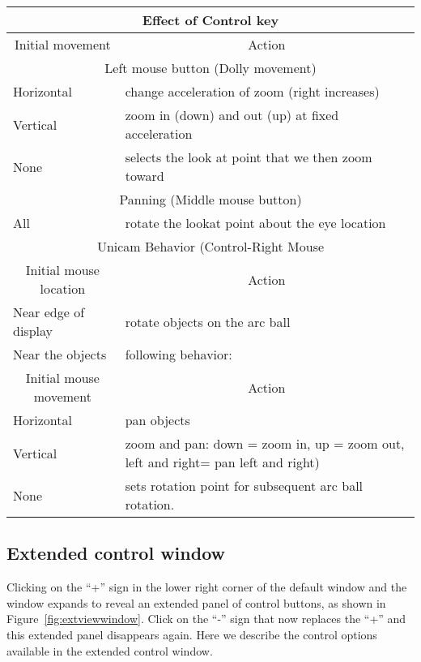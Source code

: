 \begin{center}
\begin{tabular}{|l|p{3in}} \hline
    \multicolumn{2}{|c|}{Effect of Control key} \\ \hline
    \multicolumn{1}{|c|}{Initial movement} & 
    \multicolumn{1}{|c|}{Action}\\ 
    \hline
    \multicolumn{2}{|c|}{Left mouse button (Dolly movement)}\\
    Horizontal & change acceleration of zoom (right increases) \\
    Vertical & zoom in (down) and out (up) at fixed acceleration \\
    None & selects the look at point that we then zoom toward \\
    \hline
    \multicolumn{2}{|c|}{Panning (Middle mouse button)} \\
    All  & rotate the lookat point about the eye location \\
    \hline
    \multicolumn{2}{|c|}{Unicam Behavior (Control-Right Mouse}\\
    \multicolumn{1}{|c|}{Initial mouse location} & 
    \multicolumn{1}{|c|}{Action}\\ 
    \hline
    Near edge of display & rotate objects on the arc ball \\
    Near the objects & following behavior: \\
    \hline
    \multicolumn{1}{|c|}{Initial mouse movement} & 
    \multicolumn{1}{|c|}{Action}\\ 
    Horizontal & pan objects \\ 
    Vertical & zoom and pan: down = zoom in, up = zoom
    out, left and right= pan left and right) \\
    None & sets rotation point for subsequent arc ball rotation.\\

\end{tabular}
\end{center}


\subsection{Extended control window}
\label{sec:view-control} 

Clicking on the ``+'' sign in the lower right corner of the default
\viewer{} window and the window expands to reveal an extended panel of
control buttons, as shown in Figure~\ref{fig:extviewwindow}.  Click on the
``-'' sign that now replaces the ``+'' and this extended panel disappears
again.  Here we describe the control options available in the extended
control window.

